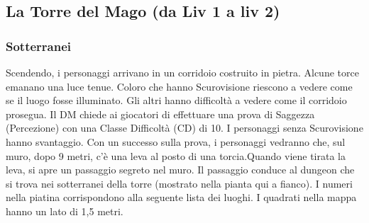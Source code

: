 \documentclass{article}
\begin{document}
\newpage
\subsection{La Torre del Mago (da Liv 1 a liv 2)}
\subsubsection{Sotterranei}
Scendendo, i personaggi arrivano in un corridoio costruito in pietra. Alcune torce emanano una luce tenue. Coloro che hanno Scurovisione riescono a vedere come se il luogo fosse illuminato. Gli altri hanno difficoltà a vedere come il corridoio prosegua. Il DM chiede ai giocatori di effettuare una prova di Saggezza (Percezione) con una Classe Difficoltà (CD) di 10. I personaggi senza Scurovisione hanno svantaggio. Con un successo sulla prova, i personaggi vedranno che, sul muro, dopo 9 metri, c'è una leva al posto di una torcia.Quando viene tirata la leva, si apre un passaggio segreto nel muro. Il passaggio conduce al dungeon che si trova nei sotterranei della torre (mostrato nella pianta qui a fianco). I numeri nella piatina corrispondono alla seguente lista dei luoghi. I quadrati nella mappa hanno un lato di 1,5 metri.
\end{document}
